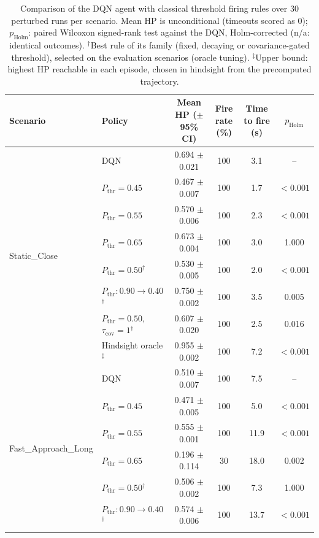 \begin{table}[htbp]
\centering
\caption{Comparison of the DQN agent with classical threshold firing rules over 30 perturbed runs per scenario. Mean HP is unconditional (timeouts scored as 0); $p_{\mathrm{Holm}}$: paired Wilcoxon signed-rank test against the DQN, Holm-corrected (n/a: identical outcomes). $^{\dagger}$Best rule of its family (fixed, decaying or covariance-gated threshold), selected on the evaluation scenarios (oracle tuning). $^{\ddagger}$Upper bound: highest HP reachable in each episode, chosen in hindsight from the precomputed trajectory.}
\label{tab:comparison-traditional-rl}
\small
\begin{tabular}{llcccc}
\toprule
\textbf{Scenario} & \textbf{Policy} & \textbf{Mean HP ($\pm$95\% CI)} & \textbf{Fire rate (\%)} & \textbf{Time to fire (s)} & $p_{\mathrm{Holm}}$ \\
\midrule
\multirow{8}{*}{Static\_Close} & DQN & 0.694 $\pm$ 0.021 & 100 & 3.1 & -- \\
 & $P_{\mathrm{thr}}=0.45$ & 0.467 $\pm$ 0.007 & 100 & 1.7 & $<0.001$ \\
 & $P_{\mathrm{thr}}=0.55$ & 0.570 $\pm$ 0.006 & 100 & 2.3 & $<0.001$ \\
 & $P_{\mathrm{thr}}=0.65$ & 0.673 $\pm$ 0.004 & 100 & 3.0 & 1.000 \\
 & $P_{\mathrm{thr}}=0.50$$^{\dagger}$ & 0.530 $\pm$ 0.005 & 100 & 2.0 & $<0.001$ \\
 & $P_{\mathrm{thr}}: 0.90 \to 0.40$$^{\dagger}$ & 0.750 $\pm$ 0.002 & 100 & 3.5 & 0.005 \\
 & $P_{\mathrm{thr}}=0.50$, $\tau_{\mathrm{cov}}=1$$^{\dagger}$ & 0.607 $\pm$ 0.020 & 100 & 2.5 & 0.016 \\
 & Hindsight oracle$^{\ddagger}$ & 0.955 $\pm$ 0.002 & 100 & 7.2 & $<0.001$ \\
\midrule
\multirow{8}{*}{Fast\_Approach\_Long} & DQN & 0.510 $\pm$ 0.007 & 100 & 7.5 & -- \\
 & $P_{\mathrm{thr}}=0.45$ & 0.471 $\pm$ 0.005 & 100 & 5.0 & $<0.001$ \\
 & $P_{\mathrm{thr}}=0.55$ & 0.555 $\pm$ 0.001 & 100 & 11.9 & $<0.001$ \\
 & $P_{\mathrm{thr}}=0.65$ & 0.196 $\pm$ 0.114 & 30 & 18.0 & 0.002 \\
 & $P_{\mathrm{thr}}=0.50$$^{\dagger}$ & 0.506 $\pm$ 0.002 & 100 & 7.3 & 1.000 \\
 & $P_{\mathrm{thr}}: 0.90 \to 0.40$$^{\dagger}$ & 0.574 $\pm$ 0.006 & 100 & 13.7 & $<0.001$ \\
$$
\end{tabular}
\end{table}
